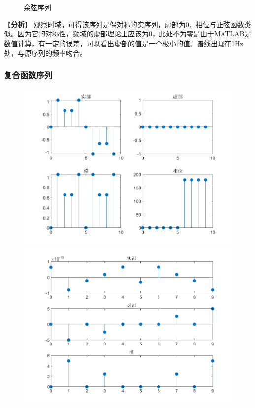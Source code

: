 \documentclass{../source/zjureport}
\begin{document}
\begin{figure}[htbp]
\begin{minipage}[t]{0.48\textwidth}
                    \end{minipage}
                    \caption{余弦序列}
                \end{figure}

                【\textbf{分析}】
                观察时域，可得该序列是偶对称的实序列，虚部为0，相位与正弦函数类似。因为它的对称性，频域的虚部理论上应该为0，此处不为零是由于MATLAB是数值计算，有一定的误差，可以看出虚部的值是一个极小的值。谱线出现在1Hz处，与原序列的频率吻合。



            \subsubsection{复合函数序列}
                \begin{figure}[htbp]
                    \centering
                    \begin{minipage}[t]{0.48\textwidth}
                    \centering
                    \includegraphics[width=\textwidth]{figure/复合函数序列_phi=0.png}
                    \end{minipage}
                    \begin{minipage}[t]{0.48\textwidth}
                    \centering
                    \includegraphics[width=\textwidth]{figure/频谱_复合函数序列_phi=0.png}

\end{minipage}
\end{figure}
\end{document}
